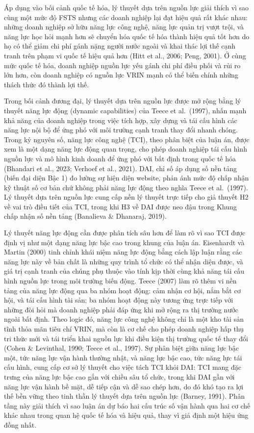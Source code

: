 \documentclass[
  a4paper,
  13pt]{extreport}
\begin{document}
Áp dụng vào bối cảnh quốc tế hóa, lý thuyết dựa trên nguồn lực giải
thích vì sao cùng một mức độ FSTS nhưng các doanh nghiệp lại đạt hiệu
quả rất khác nhau: những doanh nghiệp sở hữu năng lực công nghệ, năng
lực quản trị vượt trội, và năng lực học hỏi mạnh hơn sẽ chuyển hóa quốc
tế hóa thành hiệu quả tốt hơn do họ có thể giảm chi phí gánh nặng người
nước ngoài và khai thác lợi thế cạnh tranh trên phạm vi quốc tế hiệu quả
hơn (Hitt et al., 2006; Peng, 2001). Ở cùng mức quốc tế hóa, doanh
nghiệp nguồn lực yếu gánh chi phí điều phối và rủi ro lớn hơn, còn doanh
nghiệp có nguồn lực VRIN mạnh có thể biến chính những thách thức đó
thành lợi thế.

Trong bối cảnh đương đại, lý thuyết dựa trên nguồn lực được mở rộng bằng
lý thuyết năng lực động (dynamic capabilities) của Teece et al.~(1997),
nhấn mạnh khả năng của doanh nghiệp trong việc tích hợp, xây dựng và tái
cấu hình các năng lực nội bộ để ứng phó với môi trường cạnh tranh thay
đổi nhanh chóng. Trong kỷ nguyên số, năng lực công nghệ (TCI), theo phân
biệt của luận án, được xem là một dạng năng lực động quan trọng, cho
phép doanh nghiệp tái cấu hình nguồn lực và mô hình kinh doanh để ứng
phó với bất định trong quốc tế hóa (Bhandari et al., 2023; Verhoef et
al., 2021). DAI, chỉ số áp dụng số nền tảng (biến đại diện Bậc 1) đo
lường sự hiện diện website, phản ánh mức độ chấp nhận kỹ thuật số cơ bản
chứ không phải năng lực động theo nghĩa Teece et al.~(1997). Lý thuyết
dựa trên nguồn lực cung cấp nền lý thuyết trực tiếp cho giả thuyết H2 về
vai trò điều tiết của TCI, trong khi H3 về DAI được neo đậu trong Khung
chấp nhận số nền tảng (Banalieva \& Dhanaraj, 2019).

Lý thuyết năng lực động cần được phân tích sâu hơn để làm rõ vì sao TCI
được định vị như một dạng năng lực bậc cao trong khung của luận án.
Eisenhardt và Martin (2000) tinh chỉnh khái niệm năng lực động bằng cách
lập luận rằng các năng lực này về bản chất là những quy trình tổ chức có
thể nhận diện được, và giá trị cạnh tranh của chúng phụ thuộc vào tính
kịp thời cùng khả năng tái cấu hình nguồn lực trong môi trường biến
động. Teece (2007) làm rõ thêm vi nền tảng của năng lực động qua ba nhóm
hoạt động: cảm nhận cơ hội, nắm bắt cơ hội, và tái cấu hình tài sản; ba
nhóm hoạt động này tương ứng trực tiếp với những đòi hỏi mà doanh nghiệp
phải đáp ứng khi mở rộng ra thị trường nước ngoài bất định. Theo logic
đó, năng lực công nghệ không chỉ là một kho tài sản tĩnh thỏa mãn tiêu
chí VRIN, mà còn là cơ chế cho phép doanh nghiệp hấp thụ tri thức mới và
tái triển khai nguồn lực khi điều kiện thị trường quốc tế thay đổi
(Cohen \& Levinthal, 1990; Teece et al., 1997). Sự phân biệt giữa năng
lực bậc một, tức năng lực vận hành thường nhật, và năng lực bậc cao, tức
năng lực tái cấu hình, cung cấp cơ sở lý thuyết cho việc tách TCI khỏi
DAI: TCI mang đặc trưng của năng lực bậc cao gắn với chiều sâu tổ chức,
trong khi DAI gần với năng lực vận hành bề mặt, dễ tiếp cận và dễ sao
chép hơn, do đó khó tạo ra lợi thế bền vững theo tinh thần lý thuyết dựa
trên nguồn lực (Barney, 1991). Phân tầng này giải thích vì sao luận án
dự báo hai cấu trúc số vận hành qua hai cơ chế khác nhau trong quan hệ
quốc tế hóa và hiệu quả, thay vì giả định một hiệu ứng đồng nhất.
\end{document}
